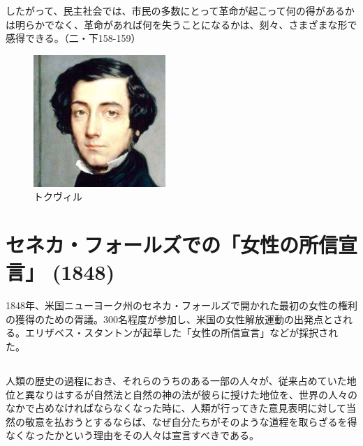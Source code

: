 したがって、民主社会では、市民の多数にとって革命が起こって何の得があるかは明らかでなく、革命があれば何を失うことになるかは、刻々、さまざまな形で感得できる。（二・下158-159）



     \begin{figure}[htbp]
       \centering
         \includegraphics[width=50mm]{images/tocqueville.jpg}
       \caption{トクヴィル}
     \end{figure}



\pagebreak{}


\section{セネカ・フォールズでの「女性の所信宣言」  (1848)}

\label{sentiment}

1848年、米国ニューヨーク州のセネカ・フォールズで開かれた最初の女性の権利の獲得のための胥議。300名程度が参加し、米国の女性解放運動の出発点とされる。エリザベス・スタントンが起草した「女性の所信宣言」などが採択された。

\subsection{}




人類の歴史の過程におき、それらのうちのある一部の人々が、従来占めていた地位と異なりはするが自然法と自然の神の法が彼らに授けた地位を、世界の人々のなかで占めなければならなくなった時に、人類が行ってきた意見表明に対して当然の敬意を払おうとするならば、なぜ自分たちがそのような道程を取らざるを得なくなったかという理由をその人々は宣言すべきである。

